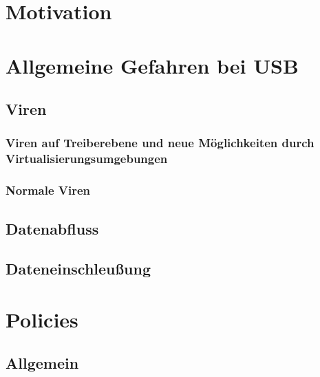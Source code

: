 \documentclass[a4paper,11pt,DIV=11,BROC=5mm,bigheadings,idxtotoc,cleardoubleempty,halfparskip,oneside,openright]{scrreprt} %
\begin{document}
			
						
				\cleardoublepage

			
				\cleardoublepage	
					
			\tableofcontents
				\cleardoublepage	
		
			\printnomenclature
				\cleardoublepage	
			
			\setcounter{page}{1}            
            \cleardoublepage
            
            
                \cleardoublepage
                
			\chapter{Motivation}
			
			\chapter{Allgemeine Gefahren bei USB}
			\section{Viren}
			\subsection{Viren auf Treiberebene und neue Möglichkeiten durch Virtualisierungsumgebungen}
			\subsection{Normale Viren}
			\section{Datenabfluss}
			\section{Dateneinschleußung}

			\chapter{Policies}
			\section{Allgemein}
\end{document}
